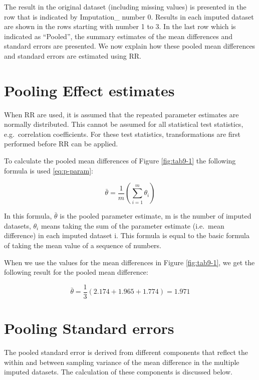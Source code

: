 \documentclass[
]{book}
\begin{document}
The result in the original dataset (including missing values) is presented in the row that is indicated by Imputation\_ number 0. Results in each imputed dataset are shown in the rows starting with number 1 to 3. In the last row which is indicated as ``Pooled'', the summary estimates of the mean differences and standard errors are presented. We now explain how these pooled mean differences and standard errors are estimated using RR.

\hypertarget{pooling-effect-estimates}{%
\section{Pooling Effect estimates}\label{pooling-effect-estimates}}

When RR are used, it is assumed that the repeated parameter estimates are normally distributed. This cannot be assumed for all statistical test statistics, e.g.~correlation coefficients. For these test statistics, transformations are first performed before RR can be applied.

To calculate the pooled mean differences of Figure \ref{fig:tab9-1} the following formula is used \eqref{eq:p-param}:

\begin{equation}
  \bar{\theta} = \frac{1}{m}\left (\sum_{i=1}^m{\theta_i}\right )
  \label{eq:p-param}
\end{equation}

In this formula, \(\bar{\theta}\) is the pooled parameter estimate, m is the number of imputed datasets, \(\theta_i\) means taking the sum of the parameter estimate (i.e.~mean difference) in each imputed dataset i. This formula is equal to the basic formula of taking the mean value of a sequence of numbers.

When we use the values for the mean differences in Figure \ref{fig:tab9-1}, we get the following result for the pooled mean difference:

\[\bar{\theta} = \frac{1}{3}(2.174 + 1.965+1.774)=1.971\]

\hypertarget{pooling-standard-errors}{%
\section{Pooling Standard errors}\label{pooling-standard-errors}}

The pooled standard error is derived from different components that reflect the within and between sampling variance of the mean difference in the multiple imputed datasets. The calculation of these components is discussed below.
\end{document}
